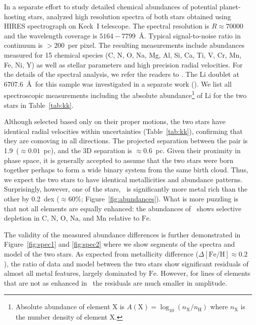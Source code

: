 \documentclass[manuscript]{aastex6}
\newcommand{\figname}{Figure}
\newcommand*\elem[1]{\ensuremath{\mathrm{#1}}}
\newcommand*\elemH[1]{\ensuremath{[\mathrm{#1}/\elem{H}]}}
\newcommand*{\feh}{\ensuremath{\elemH{Fe}}}
\newcommand{\bizarreone}{\text{Kronos}}
\begin{document}
In a separate effort to study detailed chemical abundances of potential
planet-hosting stars, \citet{2016ApJS..225...32B} analyzed high resolution
spectra of both stars obtained using HIRES spectrograph on Keck~I telescope.
The spectral resolution is $R\approx 70000$ and the wavelength coverage is
$5164-7799$~\AA.
Typical signal-to-noise ratio in continuum is $>200$~per pixel.
The resulting measurements include abundances measured for 15 chemical species
(C, N, O, Na, Mg, Al, Si, Ca, Ti, V, Cr, Mn, Fe, Ni, Y) as well as stellar parameters
and high precision radial velocities.
For the details of the spectral analysis, we refer the readers to
\citealt{2016ApJS..225...32B}.
The \elem{Li} doublet at $6707.6$~\AA\ for this sample was
investigated in a separate work (\citealt{jmlithium}).
We list all spectroscopic measurements including
the absolute abundance\footnote{
  Absolute abundance of element \elem{X} is $A(\elem{X}) = \log_{10} (n_\elem{X}/n_\elem{H})$
  where $n_\elem{X}$ is the number density of element \elem{X}.
} of \elem{Li} for the two stars in Table~\ref{tab:kk}.


Although selected based only on their proper motions, the two stars
have identical radial velocities within uncertainties (Table~\ref{tab:kk}),
confirming that they are comoving in all directions.
The projected separation between the pair is 1.9\arcmin\ ($\approx 0.01$~pc),
and the 3D separation is $\approx 0.6$~pc.
Given their proximity in phase space, it is generally accepted to assume that
the two stars were born together perhaps to form a wide binary system from the
same birth cloud.
Thus, we expect the two stars to have identical metallicities and abundance patterns.
Surprisingly, however, one of the stars, \bizarreone\ is significantly more metal
rich than the other by 0.2~dex ($\approx 60\%$; \figname~\ref{fig:abundances}).
What is more puzzling is that not all elements are equally enhanced:
the abundances of \bizarreone\ shows selective depletion in
\elem{C}, \elem{N}, \elem{O}, \elem{Na}, and \elem{Mn}
relative to \elem{Fe}.

The validity of the measured abundance differences is further demonstrated
in \figname~\ref{fig:spec1} and \ref{fig:spec2} where we show
segments of the spectra and model of the two stars.
As expected from metallicity difference ($\Delta\feh \approx 0.2$),
the ratio of data and model between the two stars show significant
residuals of almost all metal features, largely dominated by \elem{Fe}.
However, for lines of elements that are not as enhanced in \bizarreone\,
the residuals are much smaller in amplitude.
\end{document}
